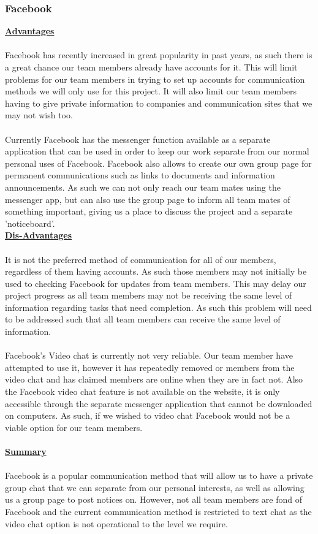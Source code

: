 \subsubsection{Facebook}
\textbf {\underline{Advantages}}\\
\\
Facebook has recently increased in great popularity in past years, as such there is a great chance our team members already have accounts for it. This will limit problems for our team members in trying to set up accounts for communication methods we will only use for this project. It will also limit our team members having to give private information to companies and communication sites that we may not wish too.\\
\\
Currently Facebook has the messenger function available as a separate application that can be used in order to keep our work separate from our normal personal uses of Facebook. Facebook also allows to create our own group page for permanent communications such as links to documents and information announcements. As such we can not only reach our team mates using the messenger app, but can also use the group page to inform all team mates of something important, giving us a place to discuss the project and a separate 'noticeboard'. \\
\textbf {\underline{Dis-Advantages}}\\
\\
It is not the preferred method of communication for all of our members, regardless of them having accounts. As such those members may not initially be used to checking Facebook for updates from team members. This may delay our project progress as all team members may not be receiving the same level of information regarding tasks that need completion. As such this problem will need to be addressed such that all team members can receive the same level of information. \\
\\
Facebook's Video chat is currently not very reliable. Our team member have attempted to use it, however it has repeatedly removed or members from the video chat and has claimed members are online when they are in fact not. Also the Facebook video chat feature is not available on the website, it is only accessible through the separate messenger application that cannot be downloaded on computers. As such, if we wished to video chat Facebook would not be a viable option for our team members.\\
\\
\textbf {\underline{Summary}}\\
\\
Facebook is a popular communication method that will allow us to have a private group chat that we can separate from our personal interests, as well as allowing us a group page to post notices on. However, not all team members are fond of Facebook and the current communication method is restricted to text chat as the video chat option is not operational to the level we require.\\
\\
